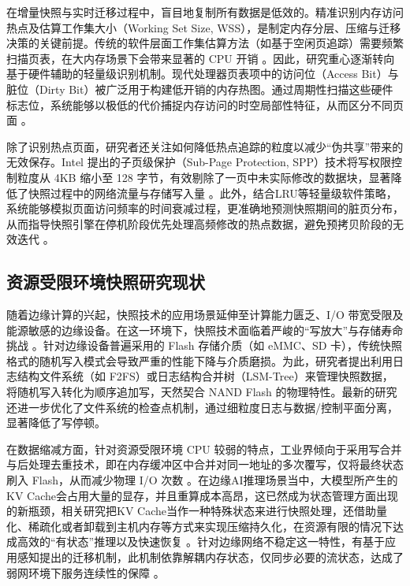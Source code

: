 在增量快照与实时迁移过程中，盲目地复制所有数据是低效的。精准识别内存访问热点及估算工作集大小（Working Set Size, WSS），是制定内存分层、压缩与迁移决策的关键前提\cite{cui2018snapfiner}。传统的软件层面工作集估算方法（如基于空闲页追踪）需要频繁扫描页表，在大内存场景下会带来显著的 CPU 开销 。因此，研究重心逐渐转向基于硬件辅助的轻量级识别机制。现代处理器页表项中的访问位（Access Bit）与脏位（Dirty Bit）被广泛用于构建低开销的内存热图\cite{wu2016hot, cui2018snapfiner}。通过周期性扫描这些硬件标志位，系统能够以极低的代价捕捉内存访问的时空局部性特征，从而区分不同页面 。

除了识别热点页面，研究者还关注如何降低热点追踪的粒度以减少“伪共享”带来的无效保存。Intel 提出的子页级保护（Sub-Page Protection, SPP）技术将写权限控制粒度从 4KB 缩小至 128 字节，有效剔除了一页中未实际修改的数据块，显著降低了快照过程中的网络流量与存储写入量\cite{ozawa2021spp} 。此外，结合LRU\cite{o1993lru}等轻量级软件策略，系统能够模拟页面访问频率的时间衰减过程，更准确地预测快照期间的脏页分布，从而指导快照引擎在停机阶段优先处理高频修改的热点数据，避免预拷贝阶段的无效迭代 。

\subsection{资源受限环境快照研究现状}

随着边缘计算的兴起，快照技术的应用场景延伸至计算能力匮乏、I/O 带宽受限及能源敏感的边缘设备。在这一环境下，快照技术面临着严峻的“写放大”与存储寿命挑战\cite{zahed2009reducing} 。针对边缘设备普遍采用的 Flash 存储介质（如 eMMC、SD 卡），传统快照格式的随机写入模式会导致严重的性能下降与介质磨损。为此，研究者提出利用日志结构文件系统（如 F2FS）或日志结构合并树（LSM-Tree）来管理快照数据，将随机写入转化为顺序追加写，天然契合 NAND Flash 的物理特性\cite{hwang2015f2fs,dayan2018lsm}。最新的研究还进一步优化了文件系统的检查点机制，通过细粒度日志与数据/控制平面分离，显著降低了写停顿\cite{luo2018wisckey,zhong2016flic}。

在数据缩减方面，针对资源受限环境 CPU 较弱的特点，工业界倾向于采用写合并与后处理去重技术\cite{zhong2016flic}，即在内存缓冲区中合并对同一地址的多次覆写，仅将最终状态刷入 Flash，从而减少物理 I/O 次数 。在边缘AI推理场景当中，大模型所产生的KV Cache会占用大量的显存，并且重算成本高昂，这已然成为状态管理方面出现的新瓶颈，相关研究把KV Cache当作一种特殊状态来进行快照处理，还借助量化、稀疏化或者卸载到主机内存等方式来实现压缩持久化，在资源有限的情况下达成高效的“有状态”推理以及快速恢复\cite{gobieski2019intelligence, panda2023snapstore} 。针对边缘网络不稳定这一特性，有基于应用感知提出的迁移机制，此机制依靠解耦内存状态，仅同步必要的流状态，达成了弱网环境下服务连续性的保障\cite{shi2022memory, akiyama2013fast} 。

